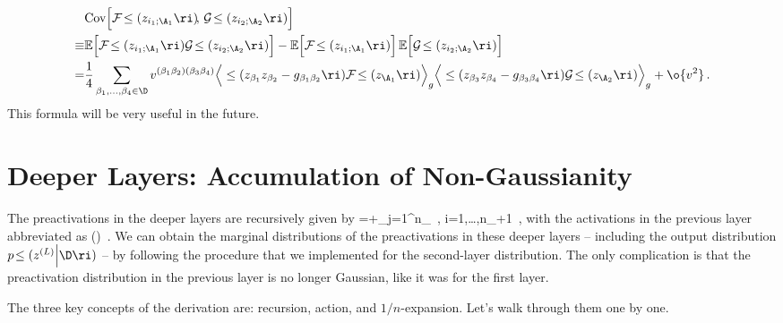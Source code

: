 \begin{align}\label{eq:general-covariance}
&\text{Cov}\Big[\mathcal{F}\!\le(z_{i_1; \A_1}\ri)\!, \, \mathcal{G}\!\le(z_{i_2; \A_2}\ri)\Big] \\
\equiv&\mathbb{E}\Big[ \mathcal{F}\!\le(z_{i_1;\A_1}\ri)\mathcal{G}\!\le(z_{i_2;\A_2}\ri)\Big]-\mathbb{E}\Big[\mathcal{F}\!\le(z_{i_1;\A_1}\ri)\Big]\, \mathbb{E}\Big[\mathcal{G}\!\le(z_{i_2;\A_2}\ri)\Big]\, \notag \\
=&\frac{1}{4}\sum_{\beta_1,\ldots,\beta_4\in\D}v^{(\beta_1\beta_2)(\beta_3\beta_4)}\Big\langle \le(z_{\beta_1} z_{\beta_2}-g_{\beta_1\beta_2}\ri)  \mathcal{F}\!\le(z_{\A_1}\ri) \Big\rangle_{g}\Big\langle  \le(z_{\beta_3} z_{\beta_4}-g_{\beta_3\beta_4}\ri)\mathcal{G}\!\le(z_{\A_2}\ri)\Big\rangle_{g}+\o{v^2}\, .\nonumber 
\end{align}
This formula will be very useful in the future.

\section{Deeper Layers: Accumulation of Non-Gaussianity}
\label{sec:deeper-layer-accumulation}
The preactivations in the deeper layers are recursively given by
\be
{} =+\sum_{j=1}^{n_{\ell}}\, , \quad {} \quad i=1,\ldots,n_{\ell+1}\, ,
\ee
with the activations in the previous layer abbreviated as
\be
{}\equiv \sigma\!\le(\ri)\, .
\ee
We can obtain the marginal distributions of the preactivations in these deeper layers -- including the output distribution $p\!\le(z^{(L)}\Big\vert\D\ri)$ -- by following the procedure that we implemented for the second-layer distribution.
The only complication is that the preactivation distribution in the previous layer is no longer Gaussian, like it was for the first layer.

The three key concepts of the derivation are: recursion, action, and $1/n$-expansion. Let's walk through them one by one.

